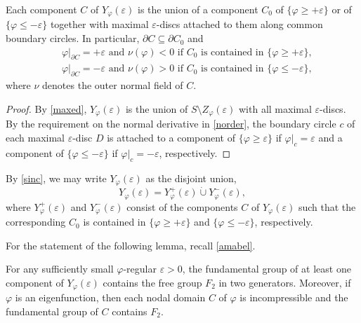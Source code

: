\begin{lem}\label{sinc}
Each component $C$ of $Y_{\varphi}({\varepsilon})$ is the union of a component $C_0$
of $\{{\varphi}\ge+{\varepsilon}\}$ or of $\{{\varphi}\le-{\varepsilon}\}$
together with maximal ${\varepsilon}$-discs attached to them along common boundary circles.
In particular, $\partial C\subseteq\partial C_0$ and
\begin{align*}
  &\text{${\varphi}|_{\partial C}=+{\varepsilon}$ and $\nu({\varphi})<0$ if $C_0$ is contained in $\{{\varphi}\ge+{\varepsilon}\}$,} \\
  &\text{${\varphi}|_{\partial C}=-{\varepsilon}$ and $\nu({\varphi})>0$ if $C_0$ is contained in $\{{\varphi}\le-{\varepsilon}\}$,}
\end{align*}
where $\nu$ denotes the outer normal field of $C$.
\end{lem}

\begin{proof}
By \cref{maxed},
$Y_{\varphi}({\varepsilon})$ is the union of $S\setminus Z_{\varphi}({\varepsilon})$ with all maximal ${\varepsilon}$-discs.
By the requirement on the normal derivative in \eqref{norder},
the boundary circle $c$ of each maximal ${\varepsilon}$-disc $D$
is attached to a component of $\{{\varphi}\ge{\varepsilon}\}$ if ${\varphi}|_c={\varepsilon}$
and a component of $\{{\varphi}\le-{\varepsilon}\}$ if ${\varphi}|_c=-{\varepsilon}$, respectively.
\end{proof}

By \cref{sinc}, we may write $Y_{\varphi}({\varepsilon})$ as the disjoint union,
\begin{equation}\label{ypm}
  Y_{\varphi}({\varepsilon}) = Y_{\varphi}^+({\varepsilon}) \dot\cup Y_{\varphi}^-({\varepsilon}),
\end{equation}
where $Y_{\varphi}^+({\varepsilon})$ and $Y_{\varphi}^-({\varepsilon})$ consist of the components $C$ of $Y_{\varphi}({\varepsilon})$
such that the corresponding $C_0$  is contained in $\{{\varphi}\ge+{\varepsilon}\}$ and $\{{\varphi}\le-{\varepsilon}\}$,
respectively.

For the statement of the following lemma, recall \cref{amabel}.

\begin{lem}\label{eul}
For any sufficiently small ${\varphi}$-regular ${\varepsilon}>0$,
the fundamental group of at least one component of $Y_{\varphi}({\varepsilon})$ contains
the free group $F_2$ in two generators.
Moreover, if ${\varphi}$ is an eigenfunction,
then each nodal domain $C$ of ${\varphi}$ is incompressible
and the fundamental group of $C$ contains $F_2$. 
\end{lem}

